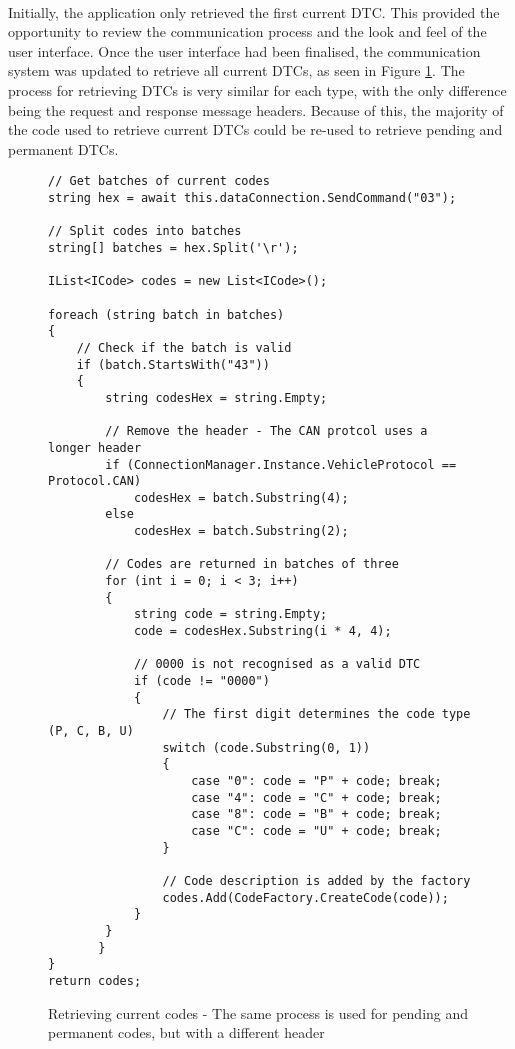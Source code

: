 	\paragraph{}{
	Initially, the application only retrieved the first current DTC. This provided the opportunity to review the communication process and the look and feel of the user interface. Once the user interface had been finalised, the communication system was updated to retrieve all current DTCs, as seen in Figure \ref{code:DTCModuleCodes}. The process for retrieving DTCs is very similar for each type, with the only difference being the request and response message headers. Because of this, the majority of the code used to retrieve current DTCs could be re-used to retrieve pending and permanent DTCs.
	}
	
	\begin{figure}[h]
		\begin{lstlisting}
// Get batches of current codes
string hex = await this.dataConnection.SendCommand("03");

// Split codes into batches
string[] batches = hex.Split('\r');

IList<ICode> codes = new List<ICode>();

foreach (string batch in batches)
{
	// Check if the batch is valid
    if (batch.StartsWith("43"))
    {        
        string codesHex = string.Empty;
        		
		// Remove the header - The CAN protcol uses a longer header
		if (ConnectionManager.Instance.VehicleProtocol == Protocol.CAN)
			codesHex = batch.Substring(4);
        else
			codesHex = batch.Substring(2);

        // Codes are returned in batches of three
		for (int i = 0; i < 3; i++)
		{
			string code = string.Empty;
			code = codesHex.Substring(i * 4, 4);

			// 0000 is not recognised as a valid DTC
			if (code != "0000")
			{
				// The first digit determines the code type (P, C, B, U)
				switch (code.Substring(0, 1))
				{
					case "0": code = "P" + code; break;
					case "4": code = "C" + code; break;
					case "8": code = "B" + code; break;
					case "C": code = "U" + code; break;						
				}					
				
				// Code description is added by the factory
				codes.Add(CodeFactory.CreateCode(code));
			}
		}
       }
}
return codes;
		\end{lstlisting}
		\caption{Retrieving current codes - The same process is used for pending and permanent codes, but with a different header}
		\label{code:DTCModuleCodes}
	\end{figure}
			
